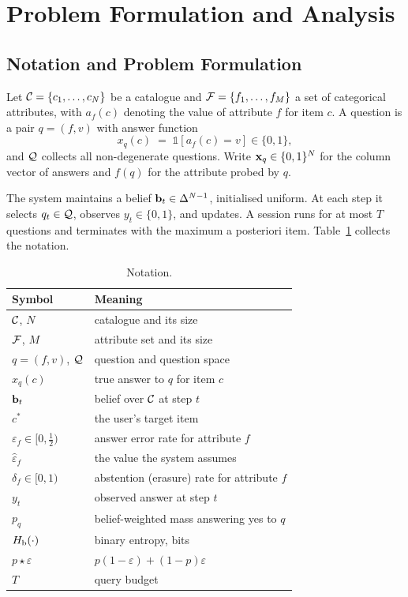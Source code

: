 \section{Problem Formulation and Analysis}
\label{sec:method}

\subsection{Notation and Problem Formulation}

Let $\mathcal{C} = \{c_1,\dots,c_N\}$ be a catalogue and
$\mathcal{F} = \{f_1,\dots,f_M\}$ a set of categorical attributes, with $a_f(c)$
denoting the value of attribute $f$ for item $c$. A question is a pair
$q=(f,v)$ with answer function
\begin{equation}
x_q(c) \;=\; \mathbb{1}\!\left[a_f(c)=v\right] \in \{0,1\},
\end{equation}
and $\mathcal{Q}$ collects all non-degenerate questions. Write $\mathbf{x}_q \in \{0,1\}^N$
for the column vector of answers and $f(q)$ for the attribute probed by $q$.

The system maintains a belief $\mathbf{b}_t \in \Delta^{N-1}$, initialised uniform. At
each step it selects $q_t \in \mathcal{Q}$, observes $y_t \in \{0,1\}$, and updates.
A session runs for at most $T$ questions and terminates with the maximum a
posteriori item. Table~\ref{tab:notation} collects the notation.

\begin{table}[t]
\caption{Notation.}
\label{tab:notation}
\centering
\footnotesize
\begin{tabular}{@{}ll@{}}
\toprule
\textbf{Symbol} & \textbf{Meaning} \\
\midrule
$\mathcal{C}$, $N$ & catalogue and its size \\
$\mathcal{F}$, $M$ & attribute set and its size \\
$q=(f,v)$, $\mathcal{Q}$ & question and question space \\
$x_q(c)$ & true answer to $q$ for item $c$ \\
$\mathbf{b}_t$ & belief over $\mathcal{C}$ at step $t$ \\
$c^\ast$ & the user's target item \\
$\varepsilon_f \in [0,\tfrac12)$ & answer error rate for attribute $f$ \\
$\hat\varepsilon_f$ & the value the system assumes \\
$\delta_f \in [0,1)$ & abstention (erasure) rate for attribute $f$ \\
$y_t$ & observed answer at step $t$ \\
$p_q$ & belief-weighted mass answering yes to $q$ \\
$H_{\mathrm{b}}(\cdot)$ & binary entropy, bits \\
$p \star \varepsilon$ & $p(1-\varepsilon)+(1-p)\varepsilon$ \\
$T$ & query budget \\
\bottomrule
\end{tabular}
\end{table}

